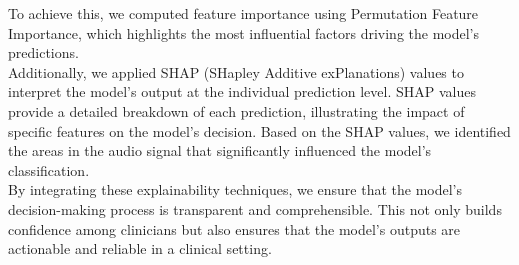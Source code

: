 To achieve this, we computed feature importance using Permutation Feature Importance, which highlights the most influential factors driving the model's predictions.\\
Additionally, we applied SHAP (SHapley Additive exPlanations) values to interpret the model's output at the individual prediction level.
 SHAP values provide a detailed breakdown of each prediction, illustrating the impact of specific features on the model's decision. 
 Based on the SHAP values, we identified the areas in the audio signal that significantly influenced the model's classification.\\
By integrating these explainability techniques, we ensure that the model’s decision-making process is transparent and comprehensible. 
This not only builds confidence among clinicians but also ensures that the model's outputs are actionable and reliable in a clinical setting.